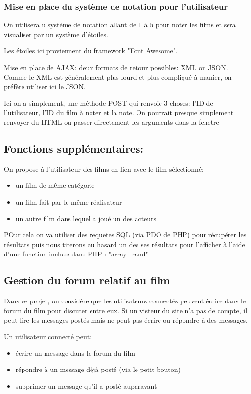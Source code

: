 \documentclass[a4paper, 11pt]{MyReport}
\begin{document}
				\subsubsection{Mise en place du système de notation pour l'utilisateur}

					On utilisera u système de notation allant de 1 à 5 pour noter les films et sera visualiser par un système d'étoiles.

					Les étoiles ici proviennent du framework "Font Awesome".

					\bigskip
					Mise en place de AJAX: deux formats de retour possibles: XML ou JSON. Comme le XML est généralement plus lourd et plus compliqué à manier, on préfère utiliser ici le JSON.

					Ici on a simplement, une méthode POST qui renvoie 3 choses: l'ID de l'utilisateur, l'ID du film à noter et la note. On pourrait presque simplement renvoyer du HTML ou passer directement les arguments dans la fenetre


			\subsection{Fonctions supplémentaires:}

				On propose à l'utilisateur des films en lien avec le film sélectionné:
				\begin{itemize}
					\item un film de même catégorie
					\item un film fait par le même réalisateur
					\item un autre film dans lequel a joué un des acteurs
				\end{itemize}

				POur cela on va utiliser des requetes SQL (via PDO de PHP) pour récupérer les résultats puis nous tirerons au hasard un des ses résultats pour l'afficher à l'aide d'une fonction incluse dans PHP : "array\_rand"


			\subsection{Gestion du forum relatif au film}

				Dans ce projet, on considère que les utilisateurs connectés peuvent écrire dans le forum du film pour discuter entre eux. Si un visteur du site n'a pas de compte, il peut lire les messages postés mais ne peut pas écrire ou répondre à des messages.

				\medskip
				Un utilisateur connecté peut:
				\begin{itemize}
					\item écrire un message dans le forum du film
					\item répondre à un message déjà posté (via le petit bouton) 
					\item supprimer un message qu'il a posté auparavant
				\end{itemize}
\end{document}
